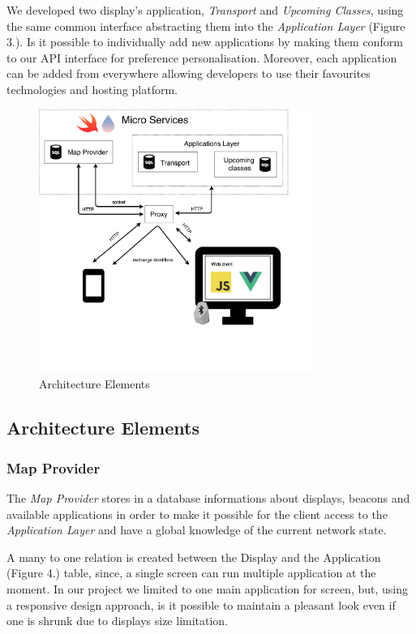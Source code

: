\documentclass[]{usiinfbachelorproject}
\begin{document}
We developed two display's application, \emph{Transport} and \emph{Upcoming Classes}, using the same common interface abstracting them into the \emph{Application Layer} (Figure 3.). Is it possible to individually add new applications by making them conform to our API interface for preference personalisation. Moreover, each application can be added from everywhere allowing developers to use their favourites technologies and hosting platform.
\begin{figure}[H]
  \centering
  \includegraphics[width=0.8\textwidth]{./images/poster_image_1.png}
    \caption{Architecture Elements}
\end{figure} 


%
\subsection{Architecture Elements}
\subsubsection{Map Provider}
The \emph{Map Provider} stores in a database informations about displays, beacons and available applications in order to make it possible for the client access to the \emph{Application Layer} and have a global knowledge of the current network state. 

A many to one relation is created between the Display and the Application (Figure 4.) table, since, a single screen can run multiple application at the moment. In our project we limited to one main application for screen, but, using a responsive design approach, is it possible to maintain a pleasant look even if one is shrunk due to displays size limitation.
\end{document}

